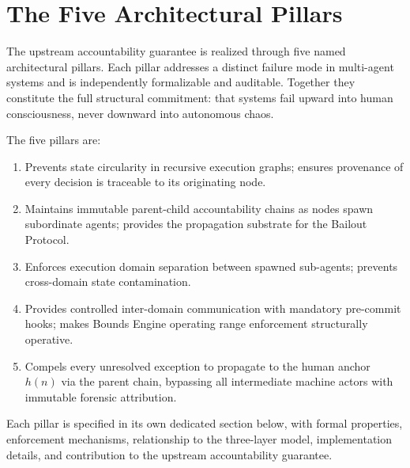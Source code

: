 \section{The Five Architectural Pillars}\label{sec:pillars}

The \bxthree{} upstream accountability guarantee is realized through five
named architectural pillars.  Each pillar addresses a distinct failure mode
in multi-agent systems and is independently formalizable and auditable.  Together
they constitute the full structural commitment: that \bxthree{} systems fail upward
into human consciousness, never downward into autonomous chaos.

The five pillars are:

\begin{enumerate}\itemsep=0pt
\item[\textbf{P1 — Loop Isolation.}] Prevents state circularity in recursive
execution graphs; ensures provenance of every decision is traceable to its
originating node.

\item[\textbf{P2 — Recursive Spawning.}] Maintains immutable parent-child
accountability chains as nodes spawn subordinate agents; provides the
propagation substrate for the Bailout Protocol.

\item[\textbf{P3 — Spatial Firewall.}] Enforces execution domain separation
between spawned sub-agents; prevents cross-domain state contamination.

\item[\textbf{P4 — Sandbox Gate.}] Provides controlled inter-domain
communication with mandatory pre-commit hooks; makes Bounds Engine
operating range enforcement structurally operative.

\item[\textbf{P5 — Bailout Protocol.}] Compels every unresolved exception
to propagate to the human anchor $h(n)$ via the parent chain, bypassing all
intermediate machine actors with immutable forensic attribution.
\end{enumerate}

Each pillar is specified in its own dedicated section below, with formal
properties, enforcement mechanisms, relationship to the three-layer model,
implementation details, and contribution to the upstream accountability
guarantee.